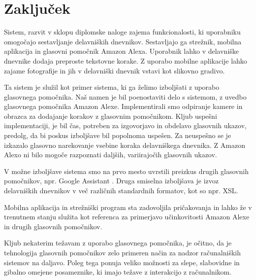 \documentclass[a4paper, 12pt]{book}
\begin{document}



\chapter{Zaključek}

Sistem, razvit v sklopu diplomske naloge zajema funkcionalosti, ki uporabniku omogočajo sestavljanje delavniških dnevnikov.
Sestavljajo ga strežnik, mobilna aplikacija in glasovni pomočnik Amazon Alexa.
Uporabnik lahko v delavniške dnevnike dodaja preproste tekstovne korake.
Z uporabo mobilne aplikacije lahko zajame fotografije in jih v delavniški dnevnik vstavi kot slikovno gradivo.

Ta sistem je služil kot primer sistema, ki ga želimo izboljšati z uporabo glasovnega pomočnika.
Naš namen je bil poenostaviti delo s sistemom, z uvedbo glasovnega pomočnika Amazon Alexe.
Implementirali smo odpiranje kamere in obrazca za dodajanje korakov z glasovnim pomočnikom.
Kljub uspešni implementaciji, je bil čas, potreben za izgovorjavo in obdelavo glasovnih ukazov, predolg, da bi poskus izboljšave bil popolnoma uspešen.
Za neuspešno se je izkazalo glasovno narekovanje vsebine koraka delavniškega dnevnika.
Z Amazon Alexo ni bilo mogoče razpoznati daljših, variirajočih glasovnih ukazov.

V možne izboljšave sistema smo na prvo mesto uvrstili preizkus drugih glasovnih pomočnikov, npr. Google Assistant \cite{googleass}.
Druga smiselna izboljšava je izvoz delavniških dnevnikov v več različnih standardnih formatov, kot so npr. XSL.

Mobilna aplikacija in strežniški program sta zadovoljila pričakovanja in lahko že v trenutnem stanju služita kot referenca za primerjavo učinkovitosti Amazon Alexe in drugih glasovnih pomočnikov.

Kljub nekaterim težavam z uporabo glasovnega pomočnika, je očitno, da je tehnologija glasovnih pomočnikov zelo primeren način za nadzor računalniških sistemov na daljavo.
Poleg tega ponuja veliko možnosti za slepe, slabovidne in gibalno omejene posameznike, ki imajo težave z interakcijo z računalnikom.




\newpage %
\ \\
\clearpage
{}

\printbibliography
\end{document}
